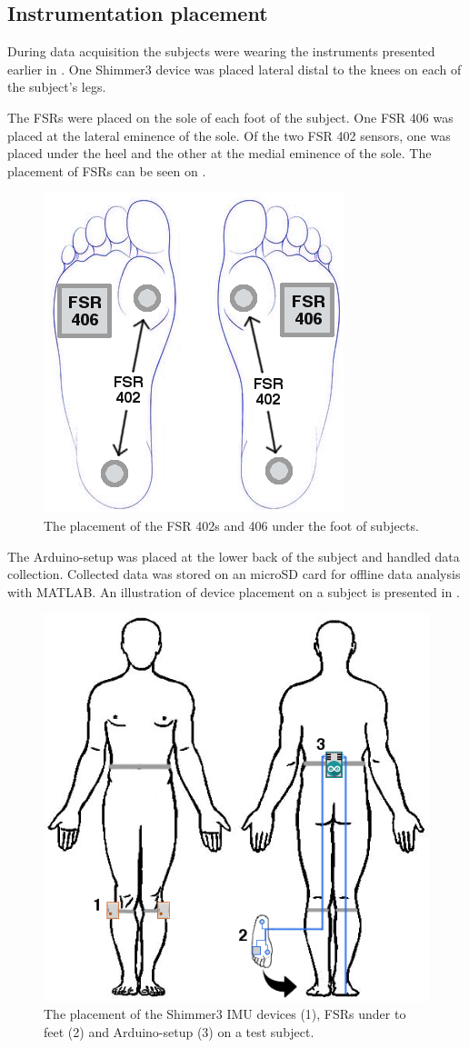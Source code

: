 \subsection{Instrumentation placement}

During data acquisition the subjects were wearing the instruments presented earlier in . One Shimmer3 device was placed lateral distal to the knees on each of the subject's legs.

The FSRs were placed on the sole of each foot of the subject. One FSR 406 was placed at the lateral eminence of the sole. Of the two FSR 402 sensors, one was placed under the heel and the other at the medial eminence of the sole. The placement of FSRs can be seen on .

\begin{figure}[H]
	\includegraphics[width=.3\textwidth]{figures/humanSoleSensorPlacement}
	\caption{The placement of the FSR 402s and 406 under the foot of subjects.}
	\label{fig:soleSensorPlacement}  %
\end{figure}

The Arduino-setup was placed at the lower back of the subject and handled data collection. Collected data was stored on an microSD card for offline data analysis with MATLAB. An illustration of device placement on a subject is presented in .


\begin{figure}[H]
	\includegraphics[width=.6\textwidth]{figures/bodySysSetup}
	\caption{The placement of the Shimmer3 IMU devices (1), FSRs under to feet (2) and Arduino-setup (3) on a test subject.}
	\label{fig:bodySysSetup}  %
\end{figure}


